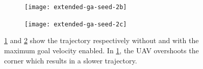 \begin{figure}
	\centering
	\begin{subfigure}[t]{0.30\columnwidth}
        		\texttt{[image: extended-ga-seed-2b]}
        		\caption{}
        		 \label{fig:ga-seed-nomaxvelb}
	\end{subfigure}	
	\hfill
	\begin{subfigure}[t]{0.30\columnwidth}
        		\texttt{[image: extended-ga-seed-2c]}
        		\caption{}
        		 \label{fig:ga-seed-maxvelc}
	\end{subfigure}		
	\caption[A demonstration of why stop points should only be used with a maximum goal velocity.]{ \ref{fig:ga-seed-nomaxvelb} and \ref{fig:ga-seed-maxvelc} show the trajectory respectively without and with the maximum goal velocity enabled. In \ref{fig:ga-seed-nomaxvelb}, the UAV overshoots the corner which results in a slower trajectory.}
    \label{fig:ga-seed-maxvel}     
\end{figure}


